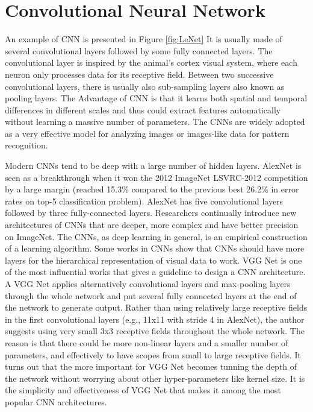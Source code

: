 \section{Convolutional Neural Network}
 An example of CNN is presented in Figure \ref{fig:LeNet} It is usually made of several convolutional layers followed by some fully connected layers. The convolutional layer is inspired by the animal's cortex visual system, where each neuron only processes data for its receptive field. Between two successive convolutional layers, there is usually also sub-sampling layers also known as pooling layers. The Advantage of CNN is that it learns both spatial and temporal differences in different scales and thus could extract features automatically without learning a massive number of parameters. The CNNs are widely adopted as a very effective model for analyzing images or images-like data for pattern recognition. 

Modern CNNs tend to be deep with a large number of hidden layers. AlexNet is seen as a breakthrough when it won the 2012 ImageNet LSVRC-2012 competition by a large margin (reached 15.3\% compared to the previous best 26.2\% in error rates on top-5 classification problem). AlexNet has five convolutional layers followed by three fully-connected layers. Researchers continually introduce new architectures of CNNs that are deeper, more complex and have better precision on ImageNet. The CNNs, as deep learning in general, is an empirical construction of a learning algorithm. Some works in CNNs show that CNNs should have more layers for the hierarchical representation of visual data to work\cite{he2016deep}. VGG Net\cite{simonyan2014very} is one of the most influential works that gives a guideline to design a CNN architecture. A VGG Net applies alternatively convolutional layers and max-pooling layers through the whole network and put several fully connected layers at the end of the network to generate output. Rather than using relatively large receptive fields in the first convolutional layers (e.g., 11x11 with stride 4 in AlexNet\cite{krizhevsky2012imagenet}), the author suggests using very small 3x3 receptive fields throughout the whole network. The reason is that there could be more non-linear layers and a smaller number of parameters, and effectively to have scopes from small to large receptive fields. It turns out that the more important for VGG Net becomes tunning the depth of the network without worrying about other hyper-parameters like kernel size. It is the simplicity and effectiveness of VGG Net that makes it among the most popular CNN architectures.

